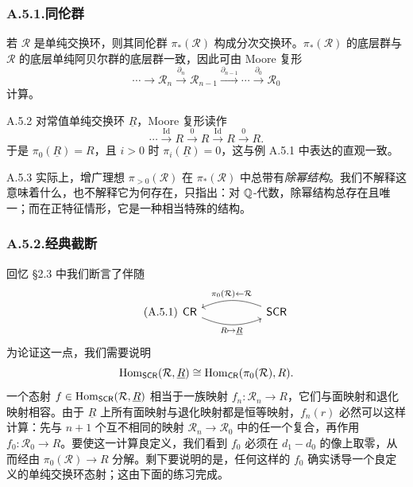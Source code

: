 \subsubsection*{A.5.1.\quad 同伦群}

若 $\mathcal R$ 是单纯交换环，则其同伦群 $\pi_*(\mathcal R)$ 构成分次交换环。$\pi_*(\mathcal R)$ 的底层群与 $\mathcal R$ 的底层单纯阿贝尔群的底层群一致，因此可由 Moore 复形
\[
\cdots\to\mathcal R_n\xrightarrow{\partial_n}\mathcal R_{n-1}\xrightarrow{\partial_{n-1}}\cdots\xrightarrow{\partial_0}\mathcal R_0
\]
计算。

\begin{exam}{A.5.2}\label{thm:a6-07-3}
对常值单纯交换环 $\underline R$，Moore 复形读作
\[
\cdots\xrightarrow{\mathrm{Id}}R\xrightarrow{0}R\xrightarrow{\mathrm{Id}}R\xrightarrow{0}R.
\]
于是 $\pi_0(\underline R)=R$，且 $i>0$ 时 $\pi_i(\underline R)=0$，这与例 A.5.1 中表达的直观一致。
\end{exam}

\begin{rem}{A.5.3}\label{thm:a6-07-4}
实际上，增广理想 $\pi_{>0}(\mathcal R)$ 在 $\pi_*(\mathcal R)$ 中总带有\emph{除幂结构}。我们不解释这意味着什么，也不解释它为何存在，只指出：对 $\mathbb{Q}$-代数，除幂结构总存在且唯一；而在正特征情形，它是一种相当特殊的结构。
\end{rem}

\subsubsection*{A.5.2.\quad 经典截断}

回忆 §2.3 中我们断言了伴随
\begin{equation}\tag{A.5.1}\label{eq:a6-07-1}
\begin{tikzcd}[column sep=5.4em, row sep=1.2em]
\mathsf{CR} \arrow[r, bend right=22, "{R\mapsto\underline R}"'] & \mathsf{SCR} \arrow[l, bend right=22, "{\pi_0(\mathcal R)\leftarrow\mathcal R}"']
\end{tikzcd}
\end{equation}
为论证这一点，我们需要说明
\[
\operatorname{Hom}_{\mathsf{SCR}}(\mathcal R,\underline R)\cong\operatorname{Hom}_{\mathsf{CR}}(\pi_0(\mathcal R),R).
\]
一个态射 $f\in\operatorname{Hom}_{\mathsf{SCR}}(\mathcal R,\underline R)$ 相当于一族映射 $f_n\colon\mathcal R_n\to R$，它们与面映射和退化映射相容。由于 $\underline R$ 上所有面映射与退化映射都是恒等映射，$f_n(r)$ 必然可以这样计算：先与 $n+1$ 个互不相同的映射 $\mathcal R_n\to\mathcal R_0$ 中的任一个复合，再作用 $f_0\colon\mathcal R_0\to R$。要使这一计算良定义，我们看到 $f_0$ 必须在 $d_1-d_0$ 的像上取零，从而经由 $\pi_0(\mathcal R)\to R$ 分解。剩下要说明的是，任何这样的 $f_0$ 确实诱导一个良定义的单纯交换环态射；这由下面的练习完成。

